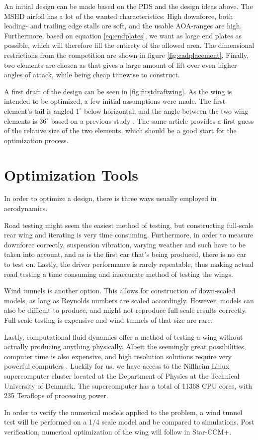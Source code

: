     An initial design can be made based on the PDS and the design ideas above. The MSHD airfoil has a lot of the wanted characteristics: High downforce, both leading- and trailing edge stalls are soft, and the usable AOA-ranges are high. Furthermore, based on equation \ref{eq:endplates}, we want as large end plates as possible, which will therefore fill the entirety of the allowed area. The dimensional restrictions from the competition are shown in figure \ref{fig:cadplacement}. Finally, two elements are chosen as that gives a large amount of lift over even higher angles of attack, while being cheap timewise to construct.

    A first draft of the design can be seen in \ref{fig:firstdraftwing}. As the wing is intended to be optimized, a few initial assumptions were made. The first element's tail is angled $1^\circ$ below horizontal, and the angle between the two wing elements is $36^\circ$ based on a previous study \cite{winginitialangle}. The same article provides a first guess of the relative size of the two elements, which should be a good start for the optimization process.

  \section{Optimization Tools}

    In order to optimize a design, there is three ways usually employed in aerodynamics.

    Road testing might seem the easiest method of testing, but constructing full-scale rear wing and iterating is very time consuming. Furthermore, in order to measure downforce correctly, suspension vibration, varying weather and such have to be taken into account, and as is the first car that's being produced, there is no car to test on. Lastly, the driver performance is rarely repeatable, thus making actual road testing a time consuming and inaccurate method of testing the wings.

    Wind tunnels is another option. This allows for construction of down-scaled models, as long as Reynolds numbers are scaled accordingly. However, models can also be difficult to produce, and might not reproduce full scale results correctly. Full scale testing is expensive and wind tunnels of that size are rare.

    Lastly, computational fluid dynamics offer a method of testing a wing without actually producing anything physically. Albeit the seemingly great possibilities, computer time is also expensive, and high resolution solutions require very powerful computers \cite{jkatz}. Luckily for us, we have access to the Niflheim Linux supercomputer cluster located at the Department of Physics at the Technical University of Denmark. The supercomputer has a total of 11368 CPU cores, with 235 Teraflops of processing power.

    In order to verify the numerical models applied to the problem, a wind tunnel test will be performed on a 1/4 scale model and be compared to simulations. Post verification, numerical optimization of the wing will follow in Star-CCM+.

